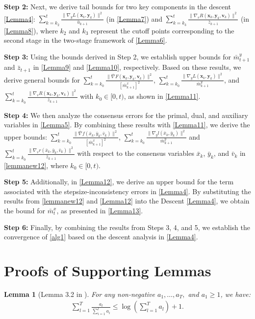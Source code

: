 \documentclass{article}
\theoremstyle{plain}
\newtheorem{lemma}[lemma]{Lemma}
\theoremstyle{definition}
\theoremstyle{remark}
\begin{document}
\textbf{Step 2:} Next, we derive tail bounds for two key components in the descent \cref{Lemma4}:
$\sum_{k=k_2}^t \frac{\|\nabla_y L(\mathbf{x}_k, \mathbf{y}_k)\|^2}{\bar{u}_{k+1}}$ (in \cref{Lemma7}) and $\sum_{k=k_3}^t \frac{\|\nabla_v R(\mathbf{x}_k, \mathbf{y}_k, \mathbf{v}_k)\|^2}{\bar{z}_{k+1}}$ (in \cref{Lemma8}),
where \(k_2\) and \(k_3\) represent the cutoff points corresponding to the second stage in the two-stage framework of \cref{Lemma6}.


\textbf{Step 3:} Using the bounds derived in Step 2, we establish upper bounds for \(\bar{m}^y_{t+1}\) and \(\bar{z}_{t+1}\) in \cref{Lemma9} and \cref{Lemma10}, respectively. Based on these results, we derive general bounds for $\sum_{k=k_0}^t \frac{\|\bar{\nabla} F(\mathbf{x}_k,\mathbf{y}_k,\mathbf{v}_k)\|^2}{[\bar{m}^x_{k+1}]^2}$, $\sum_{k=k_0}^t \frac{\|\nabla_y L(\mathbf{x}_k, \mathbf{y}_k)\|^2}{\bar{m}^y_{k+1}}$, and $\sum_{k=k_0}^t \frac{\|\nabla_v R(\mathbf{x}_k, \mathbf{y}_k, \mathbf{v}_k)\|^2}{\bar{z}_{k+1}}$ with \(k_0 \in [0, t)\), as shown in \cref{Lemma11}. 

\textbf{Step 4:} We then analyze the consensus errors for the primal, dual, and auxiliary variables in \cref{Lemma5}. By combining these results with \cref{Lemma11}, we derive the upper bounds: $\sum_{k=k_0}^t \frac{\|\bar{\nabla} f(\bar{x}_k, \bar{y}_k, \bar{v}_k)\|^2}{[\bar{m}^x_{k+1}]^2}$, $\sum_{k=k_0}^t \frac{\|\nabla_y l(\bar{x}_k, \bar{y}_k)\|^2}{\bar{m}^y_{k+1}}$ and $\sum_{k=k_0}^t \frac{\|\nabla_v r(\bar{x}_k, \bar{y}_k, \bar{v}_k)\|^2}{\bar{z}_{k+1}}$ with respect to the consensus variables $\bar{x}_k$, $\bar{y}_k$, and $\bar{v}_k$ in \cref{lemmanew12}, where \(k_0 \in [0, t)\).

\textbf{Step 5:} Additionally, in \cref{Lemma12}, we derive an upper bound for the term associated with the stepsize-inconsistency errors in \cref{Lemma4}. By substituting the results from \cref{lemmanew12} and \cref{Lemma12} into the Descent \cref{Lemma4}, we obtain the bound for \(\bar{m}^x_t\), as presented in \cref{Lemma13}.

\textbf{Step 6:} Finally, by combining the results from Steps 3, 4, and 5, we establish the convergence of \cref{alg1} based on the descent analysis in \cref{Lemma4}.

\section{Proofs of Supporting Lemmas}
\begin{lemma}[Lemma 3.2 in \citep{ward2020adagrad}]\label{Lemma1}
For any non-negative $a_1, \dots, a_T,$ and $a_1 \geq 1$, we have:
\begin{align}
\sum_{l=1}^T \frac{a_l}{\sum_{i=1}^l a_i} \leq \log \left(\sum_{l=1}^T a_l\right) + 1.\label{eq21}
\end{align}
\end{lemma}
\end{document}
